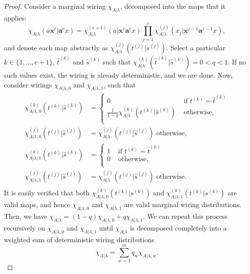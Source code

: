 \documentclass[10pt, a4paper]{article}
\numberwithin{equation}{section} %
\theoremstyle{definition}
\theoremstyle{plain}
\newcommand{\dintv}[2]{\mathopen\{#1,\ldots,#2\mathclose\}}
\newcommand{\?}{\mathrel{?}} %
\newcommand{\cvec}[1]{\boldsymbol{\mathbf{#1}}}    %
\begin{document}
              \begin{proof}
                Consider a marginal wiring \(\chi_{A|\lambda}\), decomposed into the maps that it applies:
                \begin{equation}\label{eqn:mapdecomp}
                  \chi_{A|\lambda}(a\cvec{x}^c|\cvec{a}^cx) = \chi_{A|\lambda}^{(c+1)}(a|\cvec{x}^c\cvec{a}^{c}x) \prod_{j=1}^c \chi_{A|\lambda}^{(j)}(x_j|\cvec{x}^{j-1}\cvec{a}^{j-1}x),
                \end{equation}
                and denote each map abstractly as \(\chi_{A|\lambda}^{(j)}(t^{(j)}|s^{(j)})\).
                Select a particular \(k\in\dintv{1}{c+1}\), \(\hat{t}^{(k)}\) and \(\hat{s}^{(k)}\) such that \(\chi_{A|\lambda}^{(k)}(\hat{t}^{(k)}|\hat{s}^{(k)}) = 0 < q < 1\). If no such values exist, the wiring is already deterministic, and we are done.
                Now, consider wirings \(\chi_{A|\lambda,0}\) and \(\chi_{A|\lambda,1}\), such that
                \begin{align*}
                  \chi^{(k)}_{A|\lambda,0}(t^{(k)}|\hat{s}^{(k)}) &= \begin{cases}
                    0 & \text{ if } t^{(k)} = \hat{t}^{(k)} \\
                    \frac{1}{1-q} \chi_{A|\lambda}^{(k)}(t^{(k)}|\hat{s}^{(k)}) & \text{ otherwise,} \\
                  \end{cases} \\
                      \chi^{(j)}_{A|\lambda,0}(t^{(j)}|\hat{s}^{(j)}) &= \chi_{A|\lambda}^{(j)}(t^{(j)}|\hat{s}^{(j)}) \text{ otherwise,} \\
                    \chi^{(k)}_{A|\lambda,1}(t^{(k)}|\hat{s}^{(k)}) &= \begin{cases}
                      1 & \text{ if } t^{(k)} = \hat{t}^{(k)} \\
                      0 & \text{ otherwise,} \\
                    \end{cases} \\
                      \chi^{(j)}_{A|\lambda,1}(t^{(j)}|\hat{s}^{(j)}) &= \chi_{A|\lambda}^{(j)}(t^{(j)}|\hat{s}^{(j)}) \text{ otherwise.} \\
                    \end{align*}
                    It is easily verified that both \(\chi_{A|\lambda,0}^{(k)}(t^{(k)}|s^{(k)})\) and \(\chi_{A|\lambda,1}^{(k)}(t^{(k)}|s^{(k)})\) are valid maps, and hence \(\chi_{A|\lambda,0}\) and \(\chi_{A|\lambda,1}\) are valid marginal wiring distributions. Then, we have \(\chi_{A|\lambda} = (1-q)\chi_{A|\lambda,0} + q\chi_{A|\lambda,1}\). We can repeat this process recursively on \(\chi_{A|\lambda,0}\) and \(\chi_{A|\lambda,1}\) until \(\chi_{A|\lambda}\) is decomposed completely into a weighted sum of deterministic wiring distributions
                    \[ \chi_{A|\lambda} = \sum_{w=1}^m q_w \chi_{A|\lambda,w}. \]


\end{proof}
\end{document}
